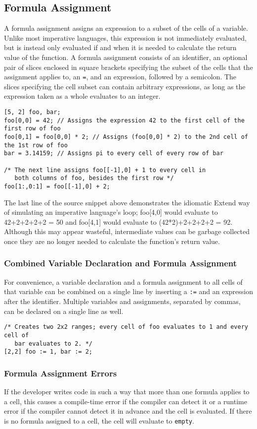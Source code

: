 \subsection{Formula Assignment}
\label{sec:formula}
A formula assignment assigns an expression to a subset of the cells of a variable. Unlike most imperative languages, this expression is not immediately evaluated, but is instead only evaluated if and when it is needed to calculate the return value of the function. A formula assignment consists of an identifier, an optional pair of slices enclosed in square brackets specifying the subset of the cells that the assignment applies to, an \texttt{=}, and an expression, followed by a semicolon. The slices specifying the cell subset can contain arbitrary expressions, as long as the expression taken as a whole evaluates to an integer.
\begin{lstlisting}
[5, 2] foo, bar;
foo[0,0] = 42; // Assigns the expression 42 to the first cell of the first row of foo
foo[0,1] = foo[0,0] * 2; // Assigns (foo[0,0] * 2) to the 2nd cell of the 1st row of foo
bar = 3.14159; // Assigns pi to every cell of every row of bar

/* The next line assigns foo[[-1],0] + 1 to every cell in 
   both columns of foo, besides the first row */
foo[1:,0:1] = foo[[-1],0] + 2; 
\end{lstlisting}
The last line of the source snippet above demonstrates the idiomatic Extend way of simulating an imperative language's loop; foo[4,0] would evaluate to 42+2+2+2+2 = 50 and foo[4,1] would evaluate to (42*2)+2+2+2+2 = 92. Although this may appear wasteful, intermediate values can be garbage collected once they are no longer needed to calculate the function's return value.
\subsubsection{Combined Variable Declaration and Formula Assignment}
For convenience, a variable declaration and a formula assignment to all cells of that variable can be combined on a single line by inserting a \texttt{:=} and an expression after the identifier. Multiple variables and assignments, separated by commas, can be declared on a single line as well.
\begin{lstlisting}
/* Creates two 2x2 ranges; every cell of foo evaluates to 1 and every cell of
   bar evaluates to 2. */
[2,2] foo := 1, bar := 2; 
\end{lstlisting}
\subsubsection{Formula Assignment Errors}
If the developer writes code in such a way that more than one formula applies to a cell, this causes a compile-time error if the compiler can detect it or a runtime error if the compiler cannot detect it in advance and the cell is evaluated. If there is no formula assigned to a cell, the cell will evaluate to \texttt{empty}.
